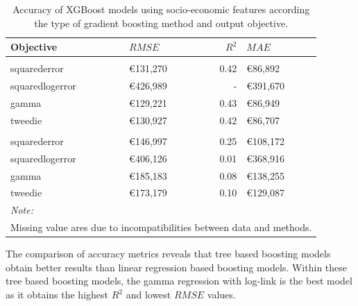 \documentclass[conference,final,]{IEEEtran}
\begin{document}
\begin{table}[H]

\caption{\label{tab:census-model-comparison}Accuracy of XGBoost models using socio-economic features according the type of gradient boosting method and output objective.}
\centering
\fontsize{8}{10}\selectfont
\begin{tabular}[t]{llrl}
\toprule
Objective & $RMSE$ & $R^2$ & $MAE$\\
\midrule
\addlinespace[0.3em]
\multicolumn{4}{l}{\textbf{Tree based}}\\
\hspace{1em}squarederror & €131,270 & 0.42 & €86,892\\
\hspace{1em}squaredlogerror & €426,989 & - & €391,670\\
\hspace{1em}gamma & €129,221 & 0.43 & €86,949\\
\hspace{1em}tweedie & €130,927 & 0.42 & €86,707\\
\addlinespace[0.3em]
\multicolumn{4}{l}{\textbf{Linear regression based}}\\
\hspace{1em}squarederror & €146,997 & 0.25 & €108,172\\
\hspace{1em}squaredlogerror & €406,126 & 0.01 & €368,916\\
\hspace{1em}gamma & €185,183 & 0.08 & €138,255\\
\hspace{1em}tweedie & €173,179 & 0.10 & €129,087\\
\bottomrule
\multicolumn{4}{l}{\textit{Note: }}\\
\multicolumn{4}{l}{Missing value ares due to incompatibilities between data and methods.}\\
\end{tabular}
\end{table}

The comparison of accuracy metrics reveals that tree based boosting models obtain better results than linear regression based boosting models. Within these tree based boosting models, the gamma regression with log-link is the best model as it obtains the highest \(R^2\) and lowest \(RMSE\) values.
\end{document}
